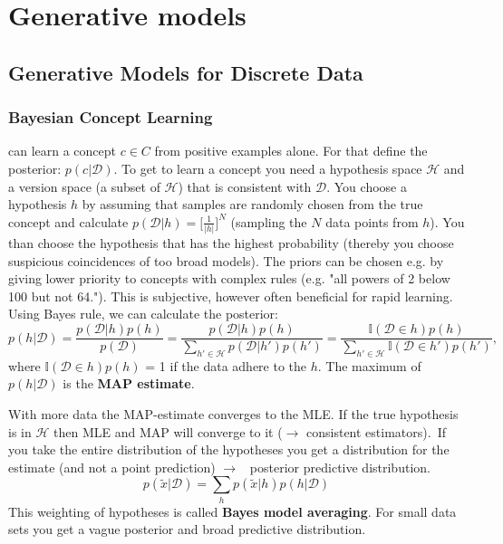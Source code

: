\documentclass[../main.tex]{subfiles}
\begin{document}
\section{Generative models}

\subsection{Generative Models for Discrete Data}
    \subsubsection{Bayesian Concept Learning} 
        can learn a concept $c \in C$ from positive examples alone. For that define the posterior: $p(c|\mathcal{D})$. To get to learn a concept you need a hypothesis space $\mathcal{H}$ and a version space (a subset of $\mathcal{H}$) that is consistent with $\mathcal{D}$. You choose a hypothesis $h$ by assuming that samples are randomly chosen from the true concept and calculate $p(\mathcal{D}|h)=\lbrack \frac{1}{|h|}\rbrack^N$ (sampling the $N$ data points from $h$). You than choose the hypothesis that has the highest probability (thereby you choose suspicious coincidences of too broad models). The priors can be chosen e.g. by giving lower priority to concepts with complex rules (e.g. "all powers of 2 below 100 but not 64."). This is subjective, however often beneficial for rapid learning. \\
        Using Bayes rule, we can calculate the posterior:
        $$
        p(h|\mathcal{D}) =\dfrac{p(\mathcal{D}|h)p(h)}{p(\mathcal{D})} =  \dfrac{p(\mathcal{D}|h)p(h)}{\sum_{h' \in \mathcal{H}}p(\mathcal{D}|h')p(h')}=\dfrac{\mathbb{I}(\mathcal{D} \in h)p(h)}{\sum_{h' \in \mathcal{H}}\mathbb{I}(\mathcal{D} \in h')p(h')},
        $$
        where $\mathbb{I}(\mathcal{D} \in h)p(h)$ = 1 if the data adhere to the $h$. The maximum of $p(h|\mathcal{D})$ is the \textbf{MAP estimate}. 
        
        With more data the MAP-estimate converges to the MLE. If the true hypothesis is in $\mathcal{H}$ then MLE and MAP will converge to it ($\rightarrow$ consistent estimators). If you take the entire distribution of the hypotheses you get a distribution for the estimate (and not a point prediction) $\rightarrow$ \ posterior predictive distribution.
        $$
        p(\tilde{x}|\mathcal{D}) = \sum_h p(\tilde{x}|h)p(h|\mathcal{D}) 
        $$
        This weighting of hypotheses is called \textbf{Bayes model averaging}. For small data sets you get a vague posterior and broad predictive distribution.
\end{document}
